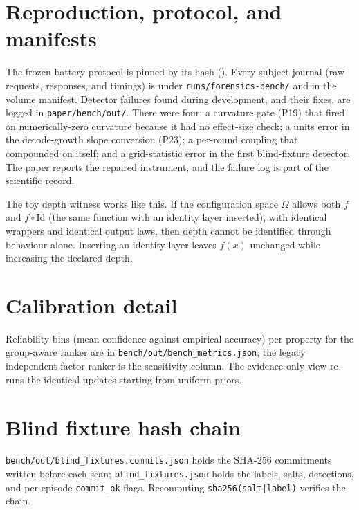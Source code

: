 \appendix
\section{Reproduction, protocol, and manifests}
\label{app:repro}
The frozen battery protocol is pinned by its hash (\texttt{\ProtocolHash}).  Every
subject journal (raw requests, responses, and timings) is under
\texttt{runs/forensics-bench/} and in the volume manifest.  Detector failures found
during development, and their fixes, are logged in \texttt{paper/bench/out/}.  There
were four: a curvature gate (P19) that fired on numerically-zero curvature because it
had no effect-size check; a units error in the decode-growth slope conversion (P23); a
per-round coupling that compounded on itself; and a grid-statistic error in the first
blind-fixture detector.  The paper reports the repaired instrument, and the failure log
is part of the scientific record.

The toy depth witness works like this.  If the configuration space $\Omega$ allows both
$f$ and $f\circ\mathrm{Id}$ (the same function with an identity layer inserted), with
identical wrappers and identical output laws, then depth cannot be identified through
behaviour alone.  Inserting an identity layer leaves $f(x)$ unchanged while increasing
the declared depth.

\begin{table}[h]\centering\footnotesize
\caption{\benchname{} subject roster with ground truth as recorded from loaded configs.}
\label{tab:subjects}

\end{table}

\section{Calibration detail}
\label{app:calibration}
Reliability bins (mean confidence against empirical accuracy) per property for the
group-aware ranker are in \texttt{bench/out/bench\_metrics.json}; the legacy
independent-factor ranker is the sensitivity column.  The evidence-only view re-runs
the identical updates starting from uniform priors.

\section{Blind fixture hash chain}
\label{app:hashchain}
\texttt{bench/out/blind\_fixtures.commits.json} holds the SHA-256 commitments written
before each scan; \texttt{blind\_fixtures.json} holds the labels, salts, detections, and
per-episode \texttt{commit\_ok} flags.  Recomputing \texttt{sha256(salt|label)} verifies
the chain.

